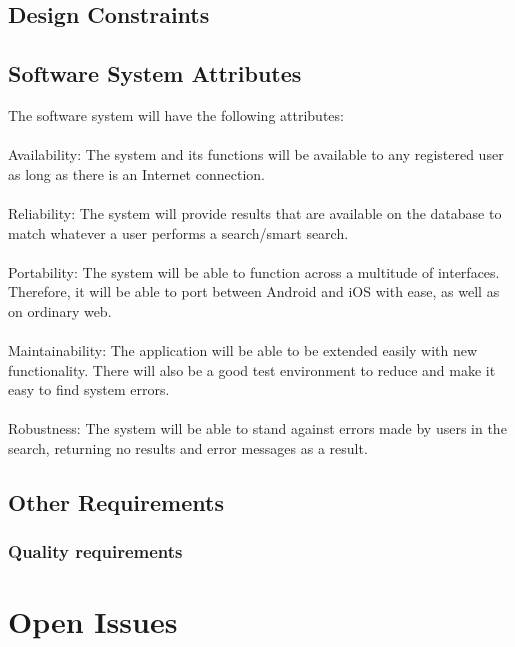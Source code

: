 \documentclass[a4paper,10pt]{article}
\begin{document}
{{	\subsection{Design Constraints}

	\subsection{Software System Attributes}
	{The software system will have the following attributes:
\\\\
		Availability: The system and its functions will be available to any registered user as long as there is an Internet connection. 
\\\\
		Reliability: The system will provide results that are available on the database to match whatever a user performs a search/smart search.
\\\\
		Portability: The system will be able to function across a multitude of interfaces. Therefore, it will be able to port between Android and iOS with ease, as well as on ordinary web. 
\\\\
		Maintainability: The application will be able to be extended easily with new functionality. There will also be a good test environment to reduce and make it easy to find system errors.  
\\\\
		Robustness: The system will be able to stand against errors made by users in the search, returning no results and error messages as a result.}
        
	\subsection{Other Requirements}

\subsubsection{Quality requirements}

\clearpage

\section{Open Issues}
}}
\end{document}
